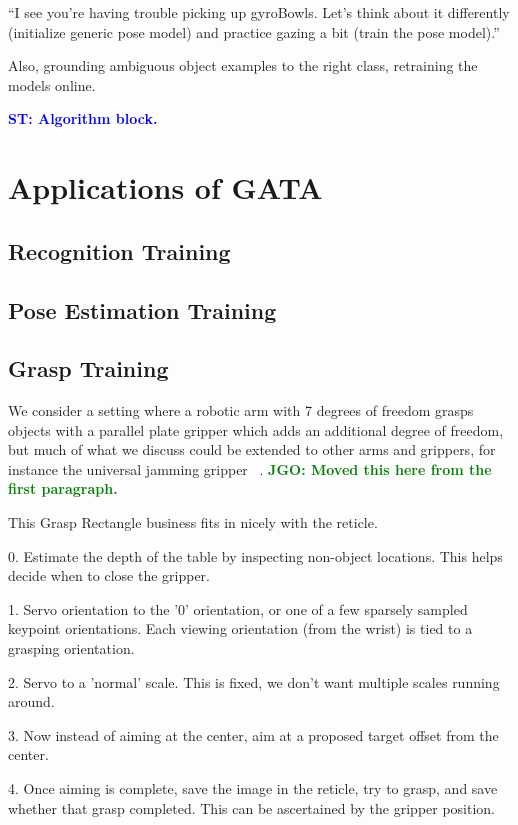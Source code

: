 \documentclass[conference]{IEEEtran}
\newcommand{\stnote}[1]{\textcolor{Blue}{\textbf{ST: #1}}}
\newcommand{\jgonote}[1]{\textcolor{Green}{\textbf{JGO: #1}}}
\begin{document}
``I see you're having trouble picking up gyroBowls. Let’s think about it differently 
(initialize generic pose model) and practice gazing a bit (train the pose model).''

Also, grounding ambiguous object examples to the right class, retraining the models online.

\stnote{Algorithm block.}


\section{Applications of GATA}

\subsection{Recognition Training}

\subsection{Pose Estimation Training}

\subsection{Grasp Training}
We consider a setting where a robotic arm
with 7 degrees of freedom grasps objects with a parallel plate gripper which adds
an additional degree of freedom, but much of what we discuss could be extended to other
arms and grippers, for instance the universal jamming gripper ~\citep{}.
\jgonote{Moved this here from the first paragraph.}

This Grasp Rectangle business fits in nicely with the reticle.

0. Estimate the depth of the table by inspecting non-object locations. This helps decide when to close the gripper.

1. Servo orientation to the '0' orientation, or one of a few sparsely sampled keypoint orientations.
Each viewing orientation (from the wrist) is tied to a grasping orientation.

2. Servo to a 'normal' scale. This is fixed, we don't want multiple scales running around.

3. Now instead of aiming at the center, aim at a proposed target offset from the center.

4. Once aiming is complete, save the image in the reticle, try to grasp, and save whether that grasp completed.
This can be ascertained by the gripper position.
\end{document}
